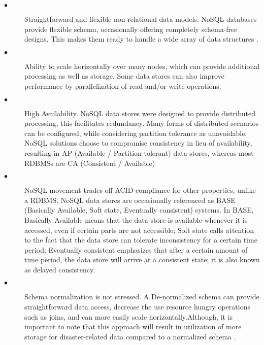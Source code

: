 \begin{description}
	\item[$\bullet$]
	Straightforward and flexible non-relational data models. NoSQL databases provide flexible schema, occasionally offering completely schema-free designs. This makes them ready to handle a wide array of data structures \cite{hecht2011nosql}  \cite{cattell2011scalable}.
	
	\item[$\bullet$]
	Ability to scale horizontally over many nodes, which can provide additional processing as well as storage. Some data stores can also improve performance by parallelization of read and/or write operations.

	\item[$\bullet$]
	High Availability. NoSQL data stores were designed to provide distributed processing, this facilitates redundancy. Many forms of distributed scenarios can be configured, while considering partition tolerance as unavoidable. NoSQL solutions choose to compromise consistency in lieu of availability, resulting in AP (Available / Partition-tolerant) data stores, whereas most RDBMSs are CA (Consistent / Available)
	
	\item[$\bullet$]
	NoSQL movement trades off ACID compliance for other properties, unlike a RDBMS. NoSQL data stores are occasionally referenced as BASE (Basically Available, Soft state, Eventually consistent) \cite{brewer2012cap} systems. In BASE, Basically Available means that the data store is available whenever it is accessed, even if certain parts are not accessible; Soft state calls attention to the fact that the data store can tolerate inconsistency for a certain time period; Eventually consistent emphasizes that after a certain amount of time period, the data store will arrive at a consistent state; it is also known as delayed consistency.

	\item[$\bullet$]
	Schema normalization is not stressed. A De-normalized schema can provide straightforward data access, decrease the use resource hungry operations such as joins, and can more easily scale horizontally.Although, it is important to note that this approach will result in utilization of more storage for disaster-related data compared to a normalized schema \cite{erl2013cloud}.	
\end{description}

